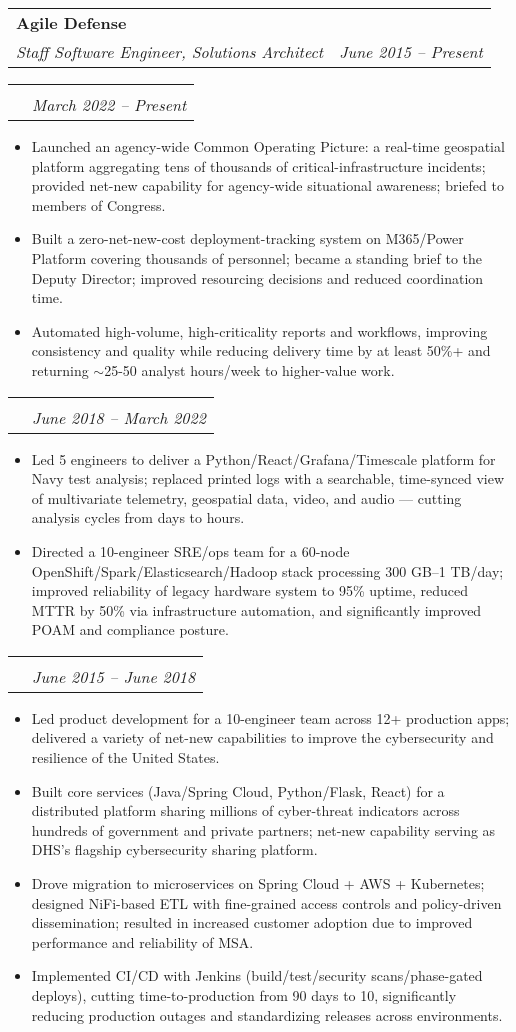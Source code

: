 \documentclass[letterpaper,11pt]{article}
\makeatletter
\newcommand{\resumeHeading}[3]{
  \begin{tabular*}{\textwidth}[t]{l@{\extracolsep{\fill}}r}
    \textbf{#1} & \\
    \color{lighter}\interlight\textit{\small#2} & \color{lighter}\interlight\textit{\small#3} \\
  \end{tabular*}
}
\newcommand{\resumeSubSubheading}[3]{
  \vspace{16pt}
  \begin{tabular*}{\textwidth}{l@{\extracolsep{\fill}}r}
    \intersemibold{#1} & \\
    \color{lighter}\interlight{\small#3} & \color{lighter}\interlight\textit{\small #2}\\
  \end{tabular*}
}
\newcommand{\resumeItemListStart}{
\begin{itemize}[leftmargin=20pt]}
\newcommand{\resumeItemListEnd}{
\end{itemize}}
\makeatother
\begin{document}
\resumeHeading{Agile Defense}{Staff Software Engineer, Solutions Architect}{June 2015 -- Present}
\vspace{8pt}
\resumeSubSubheading{Solutions Architect}{March 2022 -- Present}{CISA, Integrated Operations Division}
\resumeItemListStart
\item Launched an agency-wide Common Operating Picture: a real-time geospatial platform aggregating tens of thousands of critical-infrastructure incidents; provided net-new capability for agency-wide situational awareness; briefed to members of Congress.
\item Built a zero-net-new-cost deployment-tracking system on M365/Power Platform covering thousands of personnel; became a standing brief to the Deputy Director; improved resourcing decisions and reduced coordination time.
\item Automated high-volume, high-criticality reports and workflows, improving consistency and quality while reducing delivery time by at least 50\%+ and returning $\sim$25-50 analyst hours/week to higher-value work.
\resumeItemListEnd

\resumeSubSubheading{Senior Software Engineer, Project Lead}{June 2018 -- March 2022}{Department of the Navy \& CISA}
\resumeItemListStart
\item Led 5 engineers to deliver a Python/React/Grafana/Timescale platform for Navy test analysis; replaced printed logs with a searchable, time-synced view of multivariate telemetry, geospatial data, video, and audio --- cutting analysis cycles from days to hours.
\item Directed a 10-engineer SRE/ops team for a 60-node OpenShift/Spark/Elasticsearch/Hadoop stack processing 300 GB--1 TB/day; improved reliability of legacy hardware system to 95\% uptime, reduced MTTR by 50\% via infrastructure automation, and significantly improved POAM and compliance posture.
\resumeItemListEnd

\resumeSubSubheading{Software Engineer, Technical Lead}{June 2015 -- June 2018}{CISA, Automated Indicator Sharing Platform}
\resumeItemListStart
\item Led product development for a 10-engineer team across 12+ production apps; delivered a variety of net-new capabilities to improve the cybersecurity and resilience of the United States.
\item Built core services (Java/Spring Cloud, Python/Flask, React) for a distributed platform sharing millions of cyber-threat indicators across hundreds of government and private partners; net-new capability serving as DHS's flagship cybersecurity sharing platform.
\item Drove migration to microservices on Spring Cloud + AWS + Kubernetes; designed NiFi-based ETL with fine-grained access controls and policy-driven dissemination; resulted in increased customer adoption due to improved performance and reliability of MSA.
\item Implemented CI/CD with Jenkins (build/test/security scans/phase-gated deploys), cutting time-to-production from 90 days to 10, significantly reducing production outages and standardizing releases across environments.
\resumeItemListEnd
\end{document}
